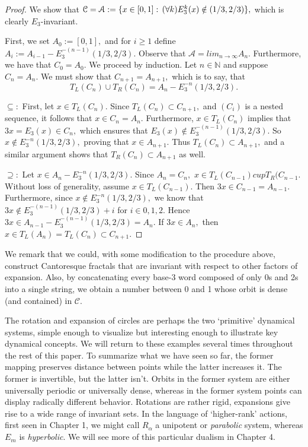 \documentclass[12pt, letterpaper, oneside]{book}
\newcommand{\ga}{\ensuremath{\alpha}}
\newcommand{\N}{\mathbb{N}}
\DeclarePairedDelimiter{\set}{\lbrace}{\rbrace}
\theoremstyle{plain}
\theoremstyle{definition}
\theoremstyle{remark}
\begin{document}
\begin{proof}
We show that $\mathcal{C} = \mathcal{A} := \set{x \in [0,1]: \, (\forall k) E_3^k(x)\notin (1/3,2/3)},$ which is clearly $E_3$-invariant. 

First, we set $A_0 := [0,1],$ and for $i \geq 1$ define $A_i := A_{i-1} - E_3^{-(n-1)}(1/3, 2/3).$  Observe that $\mathcal{A} = lim_{n\to \infty} A_n.$ Furthermore, we have that $C_0 = A_0.$ We proceed by induction. Let $n \in \N$ and suppose $C_n = A_n.$ We must show that $C_{n+1} = A_{n+1},$ which is to say, that
\[
T_L(C_n) \cup T_R(C_n) = A_n - E_3^{-n}(1/3, 2/3).
\]

$\subseteq:$ First, let $x \in T_L(C_n).$ Since $T_L(C_n) \subset C_{n+1},$ and $(C_i)$ is a nested sequence, it follows that $x \in C_n = A_n.$ Furthermore, $x \in T_L(C_n)$ implies that $3x = E_3(x) \in C_n,$ which ensures that $E_3(x) \notin E_3^{-(n-1)}(1/3, 2/3).$ So $x \notin E_3^{-n}(1/3, 2/3),$ proving that $x \in A_{n+1}.$ Thus $T_L(C_n) \subset A_{n+1},$ and a similar argument shows that $T_R(C_n) \subset A_{n+1}$ as well.

$\supseteq:$ Let $x \in A_n - E_3^{-n}(1/3, 2/3).$ Since $A_n = C_n,$ $x \in T_L(C_{n-1}) cup T_R(C_{n-1}.$ Without loss of generality, assume $x \in T_L(C_{n-1}).$ Then $3x \in C_{n-1} = A_{n-1}.$ Furthermore, since $x \notin E_3^{-n}(1/3, 2/3),$ we know that $3x \notin E_3^{-(n-1)}(1/3, 2/3) + i$ for $i \in {0, 1, 2}.$ Hence $3x \in A_{n-1} - E_3^{-(n-1)}(1/3, 2/3) = A_n.$ If $3x \in A_n,$ then $x \in T_L(A_n) = T_L(C_n) \subset C_{n+1}.$
\end{proof}

We remark that we could, with some modification to the procedure above, construct Cantoresque fractals that are invariant with respect to other factors of expansion. Also, by concatenating every base-3 word composed of only 0s and 2s into a single string, we obtain a number between 0 and 1 whose orbit is dense (and contained) in $\mathcal{C}.$ 

The rotation and expansion of circles are perhaps the two `primitive' dynamical systems, simple enough to visualize but interesting enough to illustrate key dynamical concepts. We will return to these examples several times throughout the rest of this paper. To summarize what we have seen so far, the former mapping preserves distance between points while the latter increases it. The former is invertible, but the latter isn't.  Orbits in the former system are either universally periodic or universally dense, whereas in the former system points can display radically different behavior. Rotations are rather rigid, expansions give rise to a wide range of invariant sets. In the language of `higher-rank' actions, first seen in Chapter 1, we might call $R_\ga$ a unipotent or \textit{parabolic} system, whereas $E_m$ is \textit{hyperbolic}. We will see more of this particular dualism in Chapter 4. 
\end{document}
